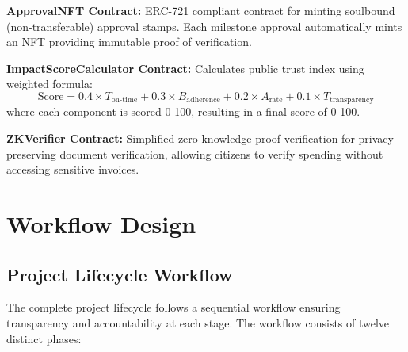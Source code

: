 \documentclass[12pt,a4wide]{report}
\theoremstyle{plain}
\theoremstyle{definition}
\theoremstyle{remark}
\begin{document}
\textbf{ApprovalNFT Contract:} ERC-721 \cite{erc721} compliant contract for minting soulbound (non-transferable) approval stamps. Each milestone approval automatically mints an NFT providing immutable proof of verification.

\textbf{ImpactScoreCalculator Contract:} Calculates public trust index using weighted formula:
\begin{equation}
\text{Score} = 0.4 \times T_{\text{on-time}} + 0.3 \times B_{\text{adherence}} + 0.2 \times A_{\text{rate}} + 0.1 \times T_{\text{transparency}}
\end{equation}
where each component is scored 0-100, resulting in a final score of 0-100.

\textbf{ZKVerifier Contract:} Simplified zero-knowledge proof verification for privacy-preserving document verification, allowing citizens to verify spending without accessing sensitive invoices.

\section{Workflow Design}

\subsection{Project Lifecycle Workflow}

The complete project lifecycle follows a sequential workflow ensuring transparency and accountability at each stage. The workflow consists of twelve distinct phases:
\end{document}

